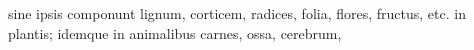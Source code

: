 sine ipsis componunt lignum, corticem, radices, folia, flores, fructus, etc. in plantis; idemque in animalibus carnes, ossa, cerebrum, 
\pend
\newpage